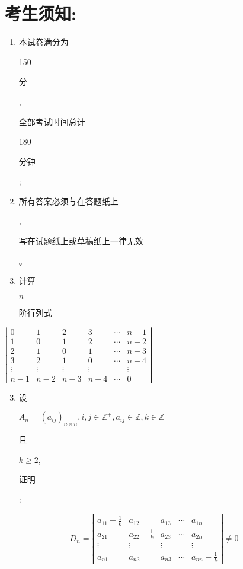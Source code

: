 \documentclass[10pt]{article}
\begin{document}
\section{考生须知:}
\begin{enumerate}
  \item \begin{CJK}{UTF8}{mj}本试卷满分为\end{CJK} 150 \begin{CJK}{UTF8}{mj}分\end{CJK}, \begin{CJK}{UTF8}{mj}全部考试时间总计\end{CJK} 180 \begin{CJK}{UTF8}{mj}分钟\end{CJK};

  \item \begin{CJK}{UTF8}{mj}所有答案必须与在答题纸上\end{CJK}, \begin{CJK}{UTF8}{mj}写在试题纸上或草稿纸上一律无效\end{CJK}。

  \item \begin{CJK}{UTF8}{mj}计算\end{CJK} $n$ \begin{CJK}{UTF8}{mj}阶行列式\end{CJK}

\end{enumerate}
$\left|\begin{array}{cccccc}0 & 1 & 2 & 3 & \cdots & n-1 \\ 1 & 0 & 1 & 2 & \cdots & n-2 \\ 2 & 1 & 0 & 1 & \cdots & n-3 \\ 3 & 2 & 1 & 0 & \cdots & n-4 \\ \vdots & \vdots & \vdots & \vdots & & \vdots \\ n-1 & n-2 & n-3 & n-4 & \cdots & 0\end{array}\right|$

\begin{enumerate}
  \setcounter{enumi}{2}
  \item \begin{CJK}{UTF8}{mj}设\end{CJK} $A_{n}=\left(a_{i j}\right)_{n \times n}, i, j \in \mathbb{Z}^{+}, a_{i j} \in \mathbb{Z}, k \in \mathbb{Z}$ \begin{CJK}{UTF8}{mj}且\end{CJK} $k \geq 2$, \begin{CJK}{UTF8}{mj}证明\end{CJK}:
\end{enumerate}
$$
D_{n}=\left|\begin{array}{ccccc}
a_{11}-\frac{1}{k} & a_{12} & a_{13} & \cdots & a_{1 n} \\
a_{21} & a_{22}-\frac{1}{k} & a_{23} & \cdots & a_{2 n} \\
\vdots & \vdots & \vdots & & \vdots \\
a_{n 1} & a_{n 2} & a_{n 3} & \cdots & a_{n n}-\frac{1}{k}
\end{array}\right| \neq 0
$$
\end{document}
